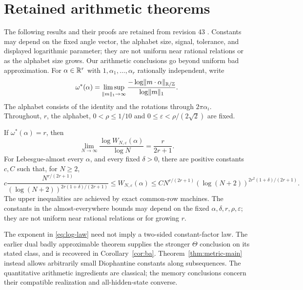 \section{Retained arithmetic theorems}\label{sec:retained}
The following results and their proofs are retained from revision 43 \cite{GTF43}. Constants may depend on the fixed angle vector, the alphabet size, signal, tolerance, and displayed logarithmic parameter; they are not uniform near rational relations or as the alphabet size grows.
Our arithmetic conclusions go beyond uniform bad approximation. For $\alpha\in\mathbb R^r$ with $1,\alpha_1,\ldots,\alpha_r$ rationally independent, write
\begin{equation}\label{eq:type-intro}
 \omega^*(\alpha)=\limsup_{\lVert m\rVert_1\to\infty}
       \frac{-\log\lVert m\cdot\alpha\rVert_{\mathbb R/\mathbb Z}}{\log\lVert m\rVert_1}.
\end{equation}
The alphabet consists of the identity and the rotations through $2\pi\alpha_i$. Throughout, $r$, the alphabet, $0<\rho\le1/10$ and
$0\le\varepsilon<\rho/(2\sqrt2)$ are fixed.

\begin{theorem}\label{thm:metric-main}
If $\omega^*(\alpha)=r$, then
\begin{equation}\label{eq:log-law}
 \lim_{N\to\infty}\frac{\log W_{N,\varepsilon}(\alpha)}{\log N}
                         =\frac{r}{2r+1}.
\end{equation}
For Lebesgue-almost every $\alpha$, and every fixed $\delta>0$, there are positive constants $c,C$ such that, for $N\ge2$,
\begin{equation}\label{eq:ae-log-bounds}
 c\frac{N^{r/(2r+1)}}{(\log(N+2))^{2r(1+\delta)/(2r+1)}}
 \le W_{N,\varepsilon}(\alpha)
 \le C N^{r/(2r+1)}(\log(N+2))^{2r^2(1+\delta)/(2r+1)}.
\end{equation}
The upper inequalities are achieved by exact common-row machines.
The constants in the almost-everywhere bounds may depend on the fixed $\alpha,\delta,r,\rho,\varepsilon$; they are not uniform near rational relations or for growing $r$.
\end{theorem}

The exponent in \eqref{eq:log-law} need not imply a two-sided constant-factor law. The earlier dual badly approximable theorem supplies the stronger $\Theta$ conclusion on its stated class, and is recovered in Corollary~\ref{cor:ba}. Theorem~\ref{thm:metric-main} instead allows arbitrarily small Diophantine constants along subsequences. The quantitative arithmetic ingredients are classical; the memory conclusions concern their compatible realization and all-hidden-state converse.

